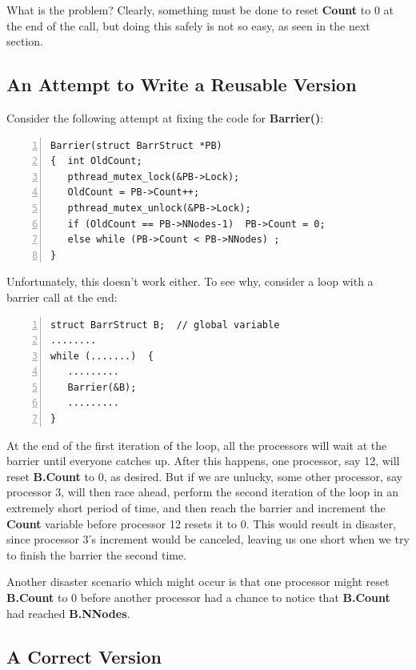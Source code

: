 What is the problem? Clearly, something must be done to reset
{\bf Count} to 0 at the end of the call, but doing this safely is not
so easy, as seen in the next section.

\subsection{An Attempt to Write a Reusable Version}

Consider the following attempt at fixing the code for {\bf Barrier()}:

\begin{samepage}
\begin{Verbatim}[fontsize=\relsize{-2},numbers=left]
Barrier(struct BarrStruct *PB)
{  int OldCount;
   pthread_mutex_lock(&PB->Lock);
   OldCount = PB->Count++;
   pthread_mutex_unlock(&PB->Lock);
   if (OldCount == PB->NNodes-1)  PB->Count = 0;
   else while (PB->Count < PB->NNodes) ;
}
\end{Verbatim}
\end{samepage}

Unfortunately, this doesn't work either. To see why, consider a loop with a
barrier call at the end:

\begin{samepage}
\begin{Verbatim}[fontsize=\relsize{-2},numbers=left]
struct BarrStruct B;  // global variable
........
while (.......)  {
   .........
   Barrier(&B);
   .........
}
\end{Verbatim}
\end{samepage}

At the end of the first iteration of the loop, all the processors will
wait at the barrier until everyone catches up. After this happens, one
processor, say 12, will reset {\bf B.Count} to 0, as desired. But if we
are unlucky, some other processor, say processor 3, will then race ahead,
perform the second iteration of the loop in an extremely short period of
time, and then reach the barrier and increment the {\bf Count} variable
before processor 12 resets it to 0. This would result in disaster, since
processor 3's increment would be canceled, leaving us one short when we
try to finish the barrier the second time.

Another disaster scenario which might occur is that one processor might
reset {\bf B.Count} to 0 before another processor had a chance to notice
that {\bf B.Count} had reached {\bf B.NNodes}.

\subsection{A Correct Version}

